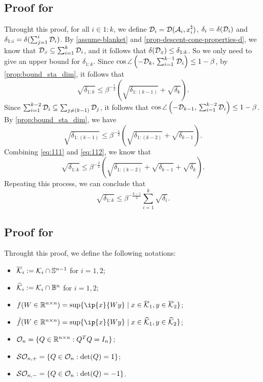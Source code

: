 \subsection{Proof for } \label{sec:proof-coro-bound_sta_dim}
Throught this proof, for all $i\in1:k$, we define $\mathcal{D}_i = \mathcal{D}(\mathcal{A}_i, x_i^{\natural})$, $\delta_i = \delta(\mathcal{D}_i)$ and $\delta_{1:i} = \delta(\sum_{j=1}^i\mathcal{D}_i)$. By \autoref{assume-blanket} and \autoref{prop-descent-cone-properties-d}, we know that $\mathcal{D}_{\scriptscriptstyle S} \subseteq \sum_{i=1}^k \mathcal{D}_i$, and it follows that $\delta(\mathcal{D}_{\scriptscriptstyle S})\leq\delta_{1:k}$. So we only need to give an upper bound for $\delta_{1:k}$. Since $\cos\angle\left({-\mathcal{D}_k},\, \sum_{i=1}^{k-1}\mathcal{D}_i\right)\leq 1 - \beta$, by \autoref{prop:bound_sta_dim}, it follows that 
\begin{equation} \label{eq:111}
  \sqrt{\delta_{1:k}} \leq \beta^{-\tfrac{1}{2}}\left(\sqrt{\delta_{1:(k-1)}} + \sqrt{\delta_k}\right).
\end{equation}
Since $\sum_{i=1}^{k-2}\mathcal{D}_i \subseteq \sum_{j\neq(k-1)}\mathcal{D}_j$, it follows that $\cos\angle\left({-\mathcal{D}_{k-1}},\, \sum_{i=1}^{k-2}\mathcal{D}_i\right)\leq  1 - \beta$. By \autoref{prop:bound_sta_dim}, we have 
\begin{equation} \label{eq:112}
  \sqrt{\delta_{1:(k-1)}} \leq \beta^{-\tfrac{1}{2}}\left(\sqrt{\delta_{1:(k-2)}} + \sqrt{\delta_{k-1}}\right).
\end{equation}
Combining \eqref{eq:111} and \eqref{eq:112}, we know that 
\[\sqrt{\delta_{1:k}} \leq \beta^{-\tfrac{2}{2}}\left(\sqrt{\delta_{1:(k-2)}} + \sqrt{\delta_{k-1}} + \sqrt{\delta_k}\right).\]
Repeating this process, we can conclude that 
\[\sqrt{\delta_{1:k}} \leq \beta^{-\tfrac{k-1}{2}}\sum_{i=1}^k\sqrt{\delta_i}.\]

\subsection{Proof for }\label{sec:proof-prop-angle-cones}
Throught this proof, we define the following notations:
\begin{itemize} 
  \item $\overline{\mathcal{K}}_i:=\mathcal{K}_i\cap\mathbb{S}^{n-1}$ for $i=1,2$;
  \item $\widehat{\mathcal{K}}_i:=\mathcal{K}_i\cap\mathbb{B}^n$ for $i=1,2$;
  \item $f(W\in\Re^{n\times n}) = \sup\{\ip{x}{Wy} \mid x \in \overline\Kscr_1, y \in\overline\Kscr_2\}$;
  \item $\hat f(W\in\Re^{n\times n}) = \sup\{\ip{x}{Wy} \mid x \in \widehat\Kscr_1, y \in\widehat\Kscr_2\}$;
  \item $\mathcal{O}_n = \{Q\in\mathbb{R}^{n\times n}: Q^TQ = I_n\}$;
  \item $\mathcal{S}\mathcal{O}_{n, +} = \{Q\in\mathcal{O}_n: \det(Q) = 1\}$;
  \item $\mathcal{S}\mathcal{O}_{n, -} = \{Q\in\mathcal{O}_n: \det(Q) = -1\}$.
\end{itemize} 

